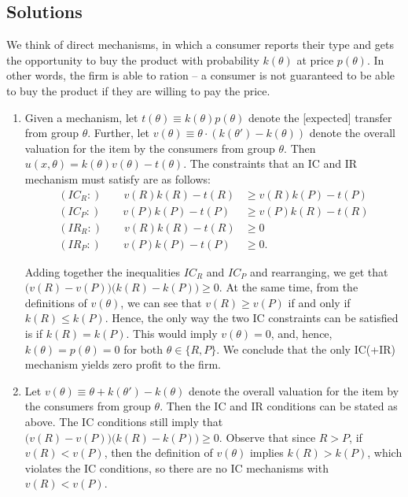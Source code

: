\documentclass[a4paper]{article}
\newif\ifsolutions
\begin{document}
\ifsolutions
\subsection*{Solutions}
We think of direct mechanisms, in which a consumer reports their type and gets the opportunity to buy the product with probability $k(\theta)$ at price $p(\theta)$. In other words, the firm is able to ration -- a consumer is not guaranteed to be able to buy the product if they are willing to pay the price.

\begin{enumerate}
	\item Given a mechanism, let $t(\theta) \equiv k(\theta)p(\theta)$ denote the [expected] transfer from group $\theta$. Further, let $v(\theta) \equiv \theta \cdot \left( k(\theta')-k(\theta) \right)$ denote the overall valuation for the item by the consumers from group $\theta$.
	Then $u(x,\theta) = k(\theta)v(\theta) - t(\theta)$.
	The constraints that an IC and IR mechanism must satisfy are as follows:
	\begin{align*}
		(IC_R:) \qquad v(R)k(R) - t(R) &\geq v(R)k(P) - t(P) \\
		(IC_P:) \qquad v(P)k(P) - t(P) &\geq v(P)k(R) - t(R) \\
		(IR_R:) \qquad v(R)k(R) - t(R) &\geq 0 \\
		(IR_P:) \qquad v(P)k(P) - t(P) &\geq 0.
	\end{align*}
	
	Adding together the inequalities $IC_R$ and $IC_P$ and rearranging, we get that $\Big( v(R) - v(P) \Big) \Big( k(R) - k(P) \Big) \geq 0$. At the same time, from the definitions of $v(\theta)$, we can see that $v(R) \geq v(P)$ if and only if $k(R) \leq k(P)$. Hence, the only way the two IC constraints can be satisfied is if $k(R) = k(P)$. This would imply $v(\theta) = 0$, and, hence, $k(\theta) = p(\theta) = 0$ for both $\theta \in \{R,P\}$. We conclude that the only IC(+IR) mechanism yields zero profit to the firm.
	
	\item Let $v(\theta) \equiv \theta + k(\theta')-k(\theta)$ denote the overall valuation for the item by the consumers from group $\theta$. Then the IC and IR conditions can be stated as above. The IC conditions still imply that $\Big( v(R) - v(P) \Big) \Big( k(R) - k(P) \Big) \geq 0$. Observe that since $R>P$, if $v(R) < v(P)$, then the definition of $v(\theta)$ implies $k(R) > k(P)$, which violates the IC conditions, so there are no IC mechanisms with $v(R) < v(P)$.
	

\end{enumerate}
\end{document}
